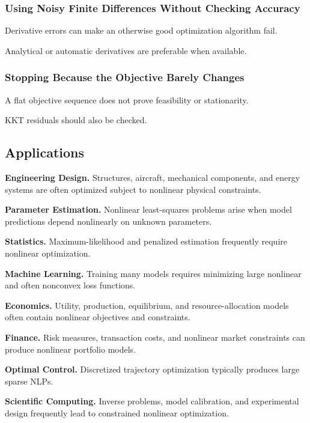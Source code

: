 \subsubsection{Using Noisy Finite Differences Without Checking Accuracy}

Derivative errors can make an otherwise good optimization algorithm fail.

Analytical or automatic derivatives are preferable when available.

\subsubsection{Stopping Because the Objective Barely Changes}

A flat objective sequence does not prove feasibility or stationarity.

KKT residuals should also be checked.

\subsection{Applications}
\label{subsec:nonlinear-programming-applications}

\begin{applicationbox}

\textbf{Engineering Design.}
Structures, aircraft, mechanical components, and energy systems are often
optimized subject to nonlinear physical constraints.

\medskip

\textbf{Parameter Estimation.}
Nonlinear least-squares problems arise when model predictions depend
nonlinearly on unknown parameters.

\medskip

\textbf{Statistics.}
Maximum-likelihood and penalized estimation frequently require nonlinear
optimization.

\medskip

\textbf{Machine Learning.}
Training many models requires minimizing large nonlinear and often
nonconvex loss functions.

\medskip

\textbf{Economics.}
Utility, production, equilibrium, and resource-allocation models often
contain nonlinear objectives and constraints.

\medskip

\textbf{Finance.}
Risk measures, transaction costs, and nonlinear market constraints can
produce nonlinear portfolio models.

\medskip

\textbf{Optimal Control.}
Discretized trajectory optimization typically produces large sparse NLPs.

\medskip

\textbf{Scientific Computing.}
Inverse problems, model calibration, and experimental design frequently
lead to constrained nonlinear optimization.

\end{applicationbox}

